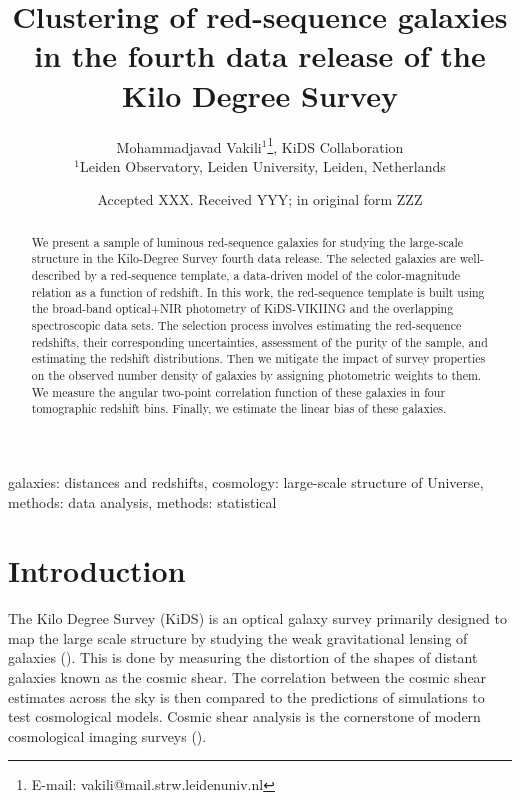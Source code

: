 \documentclass[fleqn,usenatbib,useAMS]{mnras}
\title[KiDS DR4 LRG clustering]{Clustering of red-sequence galaxies in the fourth data release of the Kilo Degree Survey}
\author[M. Vakili et al.]{
Mohammadjavad Vakili$^{1}$\thanks{E-mail: vakili@mail.strw.leidenuniv.nl}, KiDS Collaboration\\
$^{1}$Leiden Observatory, Leiden University, Leiden, Netherlands
}
\date{Accepted XXX. Received YYY; in original form ZZZ}
\begin{document}
\label{firstpage}
\pagerange{\pageref{firstpage}--\pageref{lastpage}}
\maketitle

\begin{abstract}

We present a sample of luminous red-sequence galaxies for studying the large-scale structure in the Kilo-Degree Survey fourth data release. The selected galaxies are well-described by a red-sequence template, a data-driven model of the color-magnitude relation as a function of redshift. In this work, the red-sequence template is built using the broad-band optical+NIR photometry of KiDS-VIKIING and the overlapping spectroscopic data sets. The selection process involves estimating the red-sequence redshifts, their corresponding uncertainties, assessment of the purity of the sample, and estimating the redshift distributions. Then we mitigate the impact of survey properties on the observed number density of galaxies by assigning photometric weights to them. We measure the angular two-point correlation function of these galaxies in four tomographic redshift bins. Finally, we estimate the linear bias of these galaxies. 

\end{abstract}

\begin{keywords}
galaxies: distances and redshifts, cosmology: large-scale structure of Universe, methods: data analysis, methods: statistical
\end{keywords}


\section{Introduction}

The Kilo Degree Survey (KiDS) is an optical galaxy survey primarily designed to map the large scale structure by studying the weak gravitational lensing of galaxies (\citealt{kuijken2015, hendrick2017, hendrik2018, kuijken2019}). This is done by measuring the distortion of the shapes of distant galaxies known as the cosmic shear. The correlation between the cosmic shear estimates across the sky is then compared to the predictions of simulations to test cosmological models. Cosmic shear analysis is the cornerstone of modern cosmological imaging surveys (\citealt{heymans2013,jee2016,hendrick2017,joudaki2017,troxel2017,joudaki2019, hikage2019}). 
\end{document}
